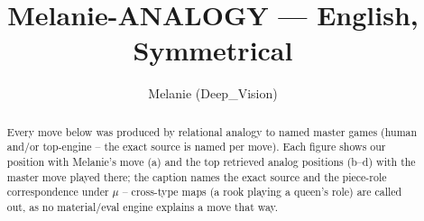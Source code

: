 \documentclass[11pt]{article}
\title{Melanie-ANALOGY — English, Symmetrical}
\author{Melanie (Deep\_Vision)}
\date{}
\begin{document}
\maketitle

\begin{abstract}Every move below was produced by relational analogy to named master games (human and/or top-engine -- the exact source is named per move). Each figure shows our position with Melanie's move (a) and the top retrieved analog positions (b--d) with the master move played there; the caption names the exact source and the piece-role correspondence under $\mu$ -- cross-type maps (a rook playing a queen's role) are called out, as no material/eval engine explains a move that way.\end{abstract}

\begin{figure}[p]\centering
\begin{subfigure}{0.46\textwidth}\centering
\resizebox{\linewidth}{!}{%
\newchessgame
\chessboard[
  setfen={r1bq1rk1/pp1pppbp/2n2np1/2p5/2P5/2N2NP1/PP1PPPBP/R1BQ1RK1 w - - 4 7},
  showmover=false,
  pgfstyle=straightmove, color=movearrow, markmove={h2-h4}
]}
\caption{}
\end{subfigure}\hfill
\begin{subfigure}{0.46\textwidth}\centering
\resizebox{\linewidth}{!}{%
\newchessgame
\chessboard[
  setfen={r1bqk2r/pp1pppbp/2n2np1/2p5/8/2NP1NP1/PPP1PPBP/R1BQ1RK1 b kq - 2 6},
  showmover=false,
  pgfstyle=straightmove, color=movearrow, markmove={d7-d5}
]}
\caption{}
\end{subfigure}
\\[4pt]
\begin{subfigure}{0.46\textwidth}\centering
\resizebox{\linewidth}{!}{%
\newchessgame
\chessboard[
  setfen={r1bqk2r/pp1pppbp/2n2np1/2p5/8/2NP1NP1/PPP1PPBP/R1BQ1RK1 b kq - 2 6},
  showmover=false,
  pgfstyle=straightmove, color=movearrow, markmove={d7-d5}
]}
\caption{}
\end{subfigure}\hfill
\begin{subfigure}{0.46\textwidth}\centering
\resizebox{\linewidth}{!}{%
\newchessgame
\chessboard[
  setfen={r1bqk2r/pp1pppbp/2n2np1/2p5/8/2NP1NP1/PPP1PPBP/R1BQ1RK1 b kq - 2 6},
  showmover=false,
  pgfstyle=straightmove, color=movearrow, markmove={d7-d5}
]}
\caption{}
\end{subfigure}

\end{figure}
\end{document}
